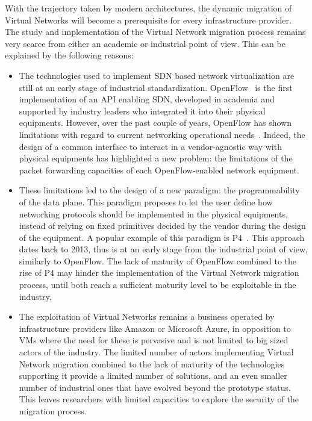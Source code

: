 With the trajectory taken by modern architectures, the dynamic migration of Virtual Networks will become a prerequisite for every infrastructure provider.
The study and implementation of the Virtual Network migration process remains very scarce from either an academic or industrial point of view. This can be explained by the following reasons:

\begin{itemize}
    \item The technologies used to implement SDN based network virtualization are still at an early stage of industrial standardization. OpenFlow~\cite{Openflow-McKeown2008} is the first implementation of an API enabling SDN, developed in academia and supported by industry leaders who integrated it into their physical equipments. However, over the past couple of years, OpenFlow has shown limitations with regard to current networking operational needs~\cite{openflowlim}. Indeed, the design of a common interface to interact in a vendor-agnostic way with physical equipments has highlighted a new problem: the limitations of the packet forwarding capacities of each OpenFlow-enabled network equipment.
    
    \item These limitations led to the design of a new paradigm: the programmability of the data plane.
    This paradigm proposes to let the user define how networking protocols should be implemented in the physical equipments, instead of relying on fixed primitives decided by the vendor during the design of the equipment. A popular example of this paradigm is P4~\cite{P4}.
    This approach dates back to 2013, thus is at an early stage from the industrial point of view, similarly to OpenFlow.
    The lack of maturity of OpenFlow combined to the rise of P4 may hinder the implementation of the Virtual Network migration process, until both reach a sufficient maturity level to be exploitable in the industry.
    
    \item The exploitation of Virtual Networks remains a business operated by infrastructure providers like Amazon or Microsoft Azure, in opposition to VMs where the need for these is pervasive and is not limited to big sized actors of the industry. The limited number of actors implementing Virtual Network migration combined to the lack of maturity of the technologies supporting it provide a limited number of solutions, and an even smaller number of industrial ones that have evolved beyond the prototype status. This leaves researchers with limited capacities to explore the security of the migration process.
\end{itemize}

